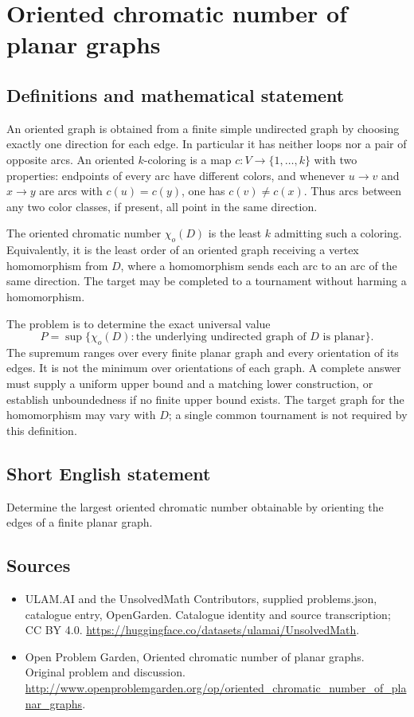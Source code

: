 \documentclass[11pt,a4paper]{article}
\begin{document}
\section*{Oriented chromatic number of planar graphs}\label{statement}

\subsection{Definitions and mathematical statement}
An oriented graph is obtained from a finite simple undirected graph by choosing exactly one direction for each edge. In particular it has neither loops nor a pair of opposite arcs. An oriented $k$-coloring is a map $c:V\to\{1,\ldots,k\}$ with two properties: endpoints of every arc have different colors, and whenever $u\to v$ and $x\to y$ are arcs with $c(u)=c(y)$, one has $c(v)\ne c(x)$. Thus arcs between any two color classes, if present, all point in the same direction.

The oriented chromatic number $\chi_o(D)$ is the least $k$ admitting such a coloring. Equivalently, it is the least order of an oriented graph receiving a vertex homomorphism from $D$, where a homomorphism sends each arc to an arc of the same direction. The target may be completed to a tournament without harming a homomorphism.

The problem is to determine the exact universal value
\[
 P=\sup\{\chi_o(D):\text{the underlying undirected graph of }D
                         \text{ is planar}\}.
\]
The supremum ranges over every finite planar graph and every orientation of its edges. It is not the minimum over orientations of each graph. A complete answer must supply a uniform upper bound and a matching lower construction, or establish unboundedness if no finite upper bound exists. The target graph for the homomorphism may vary with $D$; a single common tournament is not required by this definition.
\subsection{Short English statement}
Determine the largest oriented chromatic number obtainable by orienting the edges of a finite planar graph.
\subsection{Sources}
\begin{itemize}
\item[S1] ULAM.AI and the UnsolvedMath Contributors, supplied problems.json, catalogue entry, OpenGarden. Catalogue identity and source transcription; CC BY 4.0.
\url{https://huggingface.co/datasets/ulamai/UnsolvedMath}.
\item[S2] Open Problem Garden, Oriented chromatic number of planar graphs. Original problem and discussion.
\url{http://www.openproblemgarden.org/op/oriented_chromatic_number_of_planar_graphs}.
\end{itemize}
\end{document}
